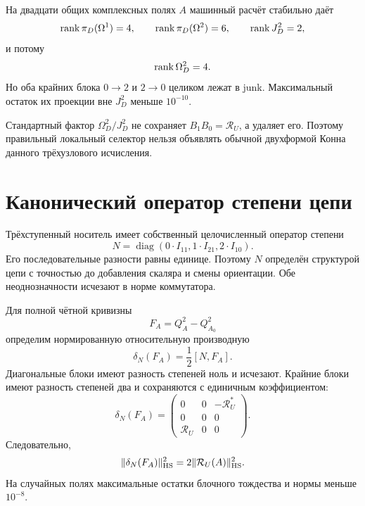 На двадцати общих комплексных полях $A$ машинный расчёт стабильно даёт
\begin{equation}
 \operatorname{rank}\pi_D(\Omega^1)=4,\qquad
 \operatorname{rank}\pi_D(\Omega^2)=6,\qquad
 \operatorname{rank} J_D^2=2,
 \label{eq:v7-degree-two-ranks}
\end{equation}
и потому
\begin{equation}
 \operatorname{rank}\Omega_D^2=4.
 \label{eq:v7-degree-two-quotient-rank}
\end{equation}
Но оба крайних блока $0\to2$ и $2\to0$ целиком лежат в junk. Максимальный
остаток их проекции вне $J_D^2$ меньше $10^{-10}$.

\begin{nogocriterion}
Стандартный фактор $\Omega_D^2/J_D^2$ не сохраняет
$B_1B_0=\mathcal R_U$, а удаляет его. Поэтому правильный локальный
селектор нельзя объявлять обычной двухформой Конна данного трёхузлового
исчисления.
\end{nogocriterion}

\section{Канонический оператор степени цепи}

Трёхступенный носитель имеет собственный целочисленный оператор степени
\begin{equation}
 N=\operatorname{diag}(0\cdot I_{11},1\cdot I_{21},2\cdot I_{10}).
 \label{eq:v7-degree-two-number-operator}
\end{equation}
Его последовательные разности равны единице. Поэтому $N$ определён
структурой цепи с точностью до добавления скаляра и смены ориентации.
Обе неоднозначности исчезают в норме коммутатора.

Для полной чётной кривизны
\begin{equation}
 F_A=Q_A^2-Q_{A_0}^2
 \label{eq:v7-degree-two-full-curvature}
\end{equation}
определим нормированную относительную производную
\begin{equation}
 \delta_N(F_A)=\frac12[N,F_A].
 \label{eq:v7-degree-two-relative-derivative}
\end{equation}
Диагональные блоки имеют разность степеней ноль и исчезают. Крайние блоки
имеют разность степеней два и сохраняются с единичным коэффициентом:
\begin{equation}
 \delta_N(F_A)=
 \begin{pmatrix}
 0&0&-\mathcal R_U^*\\
 0&0&0\\
 \mathcal R_U&0&0
 \end{pmatrix}.
 \label{eq:v7-degree-two-relative-blocks}
\end{equation}
Следовательно,
\begin{equation}
 \|\delta_N(F_A)\|_{\rm HS}^2
 =2\|\mathcal R_U(A)\|_{\rm HS}^2.
 \label{eq:v7-degree-two-relative-norm}
\end{equation}
На случайных полях максимальные остатки блочного тождества и нормы меньше
$10^{-8}$.

